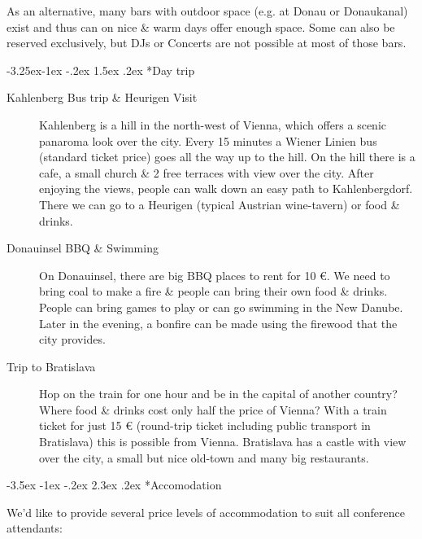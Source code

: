 \documentclass[10pt,a4paper]{article}
\makeatletter
\renewcommand\section{%
\@startsection{section}{1}{\z@}%
              {-3.5ex \@plus -1ex \@minus -.2ex}%
              {2.3ex \@plus.2ex}%
              {\color{kdelight}\sffamily\LARGE\bfseries}}
\renewcommand\subsection{%
\@startsection{subsection}{2}{\z@}%
              {-3.25ex\@plus -1ex \@minus -.2ex}%
              {1.5ex \@plus .2ex}%
              {\color{kdelight}\sffamily\Large\bfseries}}
\makeatother
\begin{document}
As an alternative, many bars with outdoor space (e.g. at Donau or Donaukanal) exist and thus can on nice \& warm days offer enough space. Some can also be reserved exclusively, but DJs or Concerts are not possible at most of those bars.


\subsection*{Day trip}
\begin{description}
\item[\color{kdedarker} Kahlenberg Bus trip \& Heurigen Visit] Kahlenberg is a hill in the north-west of Vienna, which offers a scenic panaroma look over the city. Every 15 minutes a Wiener Linien bus (standard ticket price) goes all the way up to the hill. On the hill there is a cafe, a small church \& 2 free terraces with view over the city. After enjoying the views, people can walk down an easy path to Kahlenbergdorf. There we can go to a Heurigen (typical Austrian wine-tavern) or food \& drinks.
\item[\color{kdedarker} Donauinsel BBQ \& Swimming] On Donauinsel, there are big BBQ places to rent for 10 \euro{}. We need to bring coal to make a fire \& people can bring their own food \& drinks. People can bring games to play or can go swimming in the New Danube. Later in the evening, a bonfire can be made using the firewood that the city provides.
\item[\color{kdedarker} Trip to Bratislava] Hop on the train for one hour and be in the capital of another country? Where food \& drinks cost only half the price of Vienna? With a train ticket for just 15 \euro{} (round-trip ticket including public transport in Bratislava) this is possible from Vienna. Bratislava has a castle with view over the city, a small but nice old-town and many big restaurants.
\end{description}

\cleardoublepage

\section*{Accomodation}
We'd like to provide several price levels of accommodation to suit all conference attendants:
\end{document}
